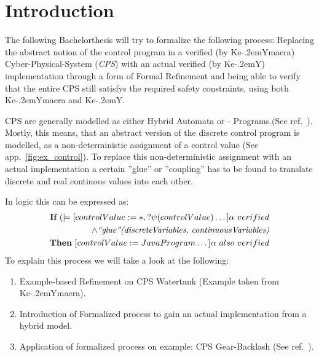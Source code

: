 
\chapter{Introduction}
\label{ch:Introduction}

The following Bachelorthesis will try to formalize the following process: Replacing the abstract notion of the control program in a verified (by Ke\kern-.2emYmaera) Cyber-Physical-System (\textit{CPS}) with an actual verified (by Ke\kern-.2emY) implementation through a form of Formal Refinement and being able to verify that the entire CPS still satisfys the required safety constraints, using both Ke\kern-.2emYmaera and Ke\kern-.2emY. 

CPS are generally modelled as either Hybrid Automata or - Programs.(See ref.~\cite{platzerb}). Mostly, this means, that an abstract version of the discrete control program is modelled, as a non-deterministic assignment of a control value (See app.~\ref{fig:ex_control}). To replace this non-deterministic assignment with an actual implementation a certain ''glue'' or ''coupling'' has to be found to translate discrete and real continous values into each other.

 In logic this can be expressed as:
\begin{equation}
\centering
\begin{split}
\textbf{If}~ (\models [ controlValue := \ast, ?\psi(controlValue) \dots] \alpha~verified \\ \wedge \textit{``glue''(discreteVariables, continuousVariables)} \\
\textbf{Then}~ [controlValue := JavaProgram \dots] \alpha~also~verified
\end{split}
\label{eq:Main_LogicRefinement}
\end{equation} To explain this process we will take a look at the following: 

\begin{enumerate}[label=\bfseries \Roman*:]

\item Example-based Refinement on CPS Watertank (Example taken from Ke\kern-.2emYmaera).
\item Introduction of Formalized process to gain an actual implementation from a hybrid model.
\item Application of formalized process on example: CPS Gear-Backlash (See ref.~\cite{bla}).
\end{enumerate}

